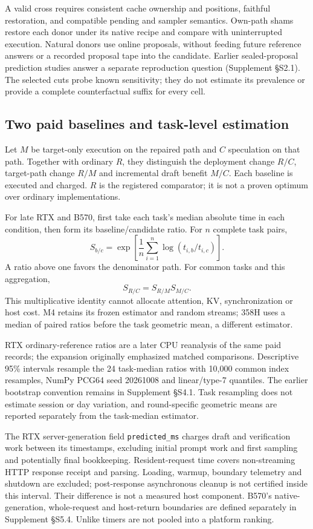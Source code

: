 A valid cross requires consistent cache ownership and positions, faithful restoration, and compatible pending and sampler semantics. Own-path shams restore each donor under its native recipe and compare with uninterrupted execution. Natural donors use online proposals, without feeding future reference answers or a recorded proposal tape into the candidate. Earlier sealed-proposal prediction studies answer a separate reproduction question (Supplement \S S2.1). The selected cuts probe known sensitivity; they do not estimate its prevalence or provide a complete counterfactual suffix for every cell.

\subsection{Two paid baselines and task-level estimation}
Let $M$ be target-only execution on the repaired path and $C$ speculation on that path. Together with ordinary $R$, they distinguish the deployment change $R/C$, target-path change $R/M$ and incremental draft benefit $M/C$. Each baseline is executed and charged. $R$ is the registered comparator; it is not a proven optimum over ordinary implementations.

For late RTX and B570, first take each task's median absolute time in each condition, then form its baseline/candidate ratio. For $n$ complete task pairs,
\begin{equation}
S_{b/c}=\exp\left[\frac{1}{n}\sum_{i=1}^{n}\log\left(t_{i,b}/t_{i,c}\right)\right].
\label{eq:gm}
\end{equation}
A ratio above one favors the denominator path. For common tasks and this aggregation,
\begin{equation}
S_{R/C}=S_{R/M}S_{M/C}.
\label{eq:identity}
\end{equation}
This multiplicative identity cannot allocate attention, KV, synchronization or host cost. M4 retains its frozen estimator and random streams; 358H uses a median of paired ratios before the task geometric mean, a different estimator.

RTX ordinary-reference ratios are a later CPU reanalysis of the same paid records; the expansion originally emphasized matched comparisons. Descriptive 95\% intervals resample the 24 task-median ratios with 10,000 common index resamples, NumPy PCG64 seed 20261008 and linear/type-7 quantiles. The earlier bootstrap convention remains in Supplement \S S4.1. Task resampling does not estimate session or day variation, and round-specific geometric means are reported separately from the task-median estimator.

The RTX server-generation field \texttt{predicted\_ms} charges draft and verification work between its timestamps, excluding initial prompt work and first sampling and potentially final bookkeeping. Resident-request time covers non-streaming HTTP response receipt and parsing. Loading, warmup, boundary telemetry and shutdown are excluded; post-response asynchronous cleanup is not certified inside this interval. Their difference is not a measured host component. B570's native-generation, whole-request and host-return boundaries are defined separately in Supplement \S S5.4. Unlike timers are not pooled into a platform ranking.
